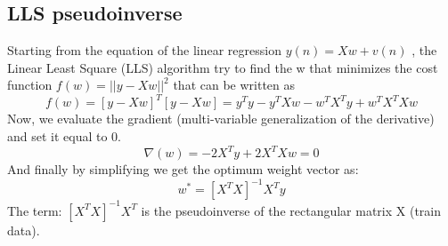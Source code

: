\documentclass[a4paper,12pt,oneside,titlepage]{article}
\begin{document}
	\subsection{LLS pseudoinverse}
	Starting from the equation of the linear regression $y(n) = Xw + v(n)$ , the Linear Least Square (LLS) algorithm try to find the w that minimizes the cost function $f(w) = ||y-Xw||^2$ that can be written as
	\begin{equation}
	f(w) =[y-Xw]^T [y-Xw] = y^Ty - y^TXw - w^TX^Ty + w^TX^TXw
	\end{equation}
	Now, we evaluate the gradient (multi-variable generalization of the derivative) and set it equal to 0.
	\begin{equation}
	\nabla(w) =-2X^Ty+2X^TXw = 0
	\end{equation}
	And finally by simplifying we get the optimum weight vector as:
	\begin{equation}
	w^*= [X^TX]^{-1}X^Ty
	\end{equation}
	The term: $[X^TX]^{-1}X^T$ is the pseudoinverse of the rectangular matrix X (train data).
\end{document}
